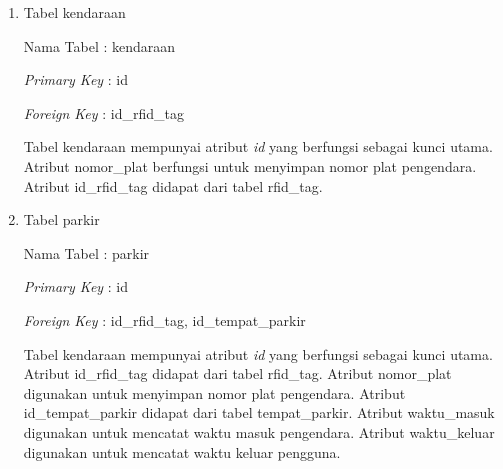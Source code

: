 \begin{enumerate}[topsep=0pt,itemsep=0pt,partopsep=0pt, parsep=0pt]
    \item Tabel kendaraan

    Nama Tabel : kendaraan

    \textit{Primary Key} : id

    \textit{Foreign Key} : id\_rfid\_tag


    Tabel kendaraan mempunyai atribut \textit{id} yang berfungsi sebagai kunci utama. Atribut nomor\_plat berfungsi untuk menyimpan nomor plat pengendara. Atribut id\_rfid\_tag didapat dari tabel rfid\_tag.

    \item Tabel parkir

    Nama Tabel : parkir

    \textit{Primary Key} : id

    \textit{Foreign Key} : id\_rfid\_tag, id\_tempat\_parkir


    Tabel kendaraan mempunyai atribut \textit{id} yang berfungsi sebagai kunci utama. Atribut id\_rfid\_tag didapat dari tabel rfid\_tag. Atribut nomor\_plat digunakan untuk menyimpan nomor plat pengendara. Atribut id\_tempat\_parkir didapat dari tabel tempat\_parkir. Atribut waktu\_masuk digunakan untuk mencatat waktu masuk pengendara. Atribut waktu\_keluar digunakan untuk mencatat waktu keluar pengguna.


\end{enumerate}
